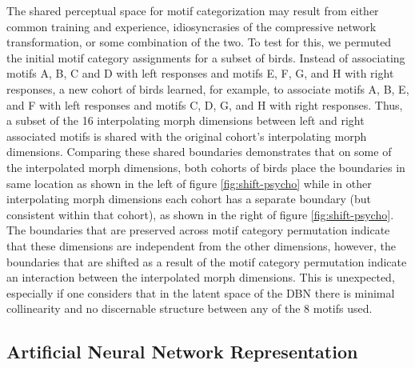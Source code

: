 The shared perceptual space for motif categorization may result from either common training and experience, idiosyncrasies of the compressive network transformation, or some combination of the two. To test for this, we permuted the initial motif category assignments for a subset of birds. Instead of associating motifs A, B, C and D with left responses and motifs E, F, G, and H with right responses, a new cohort of birds learned, for example, to associate motifs A, B, E, and F with left responses and motifs C, D, G, and H with right responses. Thus, a subset of the 16 interpolating morph dimensions between left and right associated motifs is shared with the original cohort's interpolating morph dimensions. Comparing these shared boundaries demonstrates that on some of the interpolated morph dimensions, both cohorts of birds place the boundaries in same location as shown in the left of figure \ref{fig:shift-psycho} while in other interpolating morph dimensions each cohort has a separate boundary (but consistent within that cohort), as shown in the right of figure \ref{fig:shift-psycho}. The boundaries that are preserved across motif category permutation indicate that these dimensions are independent from the other dimensions, however, the boundaries that are shifted as a result of the motif category permutation indicate an interaction between the interpolated morph dimensions. This is unexpected, especially if one considers that in the latent space of the DBN there is minimal collinearity and no discernable structure between any of the 8 motifs used.

\subsection{Artificial Neural Network Representation}


